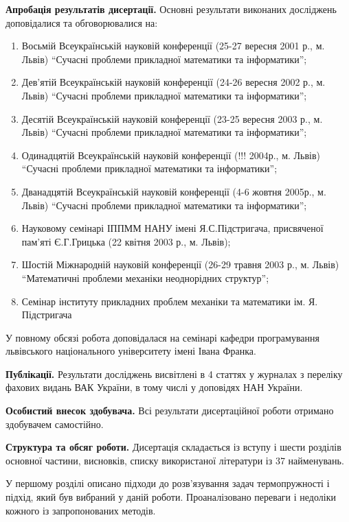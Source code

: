 \textbf{Апробація результатів дисертації.} Основні результати виконаних досліджень доповідалися та обговорювалися на:

\begin{enumerate}
\def\labelenumi{\arabic{enumi}.}
\item
  Восьмій Всеукраїнській науковій конференції (25-27 вересня 2001 р., м. Львів) ``Сучасні проблеми прикладної математики
  та інформатики'';
\item
  Дев'ятій Всеукраїнській науковій конференції (24-26 вересня 2002 р., м. Львів) ``Сучасні проблеми прикладної
  математики та інформатики'';
\item
  Десятій Всеукраїнській науковій конференції (23-25 вересня 2003 р., м. Львів) ``Сучасні проблеми прикладної математики
  та інформатики'';
\item
  Одинадцятій Всеукраїнській науковій конференції (!!! 2004р., м. Львів) ``Сучасні проблеми прикладної математики та
  інформатики'';
\item
  Дванадцятій Всеукраїнській науковій конференції (4-6 жовтня 2005р., м. Львів) ``Сучасні проблеми прикладної математики
  та інформатики'';
\item
  Науковому семінарі ІППММ НАНУ імені Я.С.Підстригача, присвяченої пам'яті Є.Г.Грицька (22 квітня 2003 р., м. Львів);
\item
  Шостій Міжнародній науковій конференції (26-29 травня 2003 р., м. Львів) ``Математичні проблеми механіки неоднорідних
  структур'';
\item
  Семінар інституту прикладних проблем механіки та математики ім. Я. Підстригача
\end{enumerate}

У повному обсязі робота доповідалася на семінарі кафедри програмування львівського національного університету імені
Івана Франка.

\textbf{Публікації.} Результати досліджень висвітлені в 4 статтях у журналах з переліку фахових видань ВАК України, в
тому числі у доповідях НАН України.

\textbf{Особистий внесок здобувача.} Всі результати дисертаційної роботи отримано здобувачем самостійно.

\textbf{Структура та обсяг роботи.} Дисертація складається із вступу і шести розділів основної частини, висновків,
списку використаної літератури із 37 найменувань.

У першому розділі описано підходи до розв'язування задач термопружності і підхід, який був вибраний у даній роботи.
Проаналізовано переваги і недоліки кожного із запропонованих методів.

